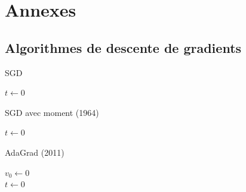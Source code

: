 \documentclass[11pt,a4paper, french]{article}
\newcommand{\vs}[1]{\vspace{#1cm}}
\theoremstyle{definition}
\begin{document}
\vs2

\nocite{kingma2017adammethodstochasticoptimization}
\nocite{starmer2023optimization}
\nocite{dereich2024convergenceratesadamoptimizer}
\renewcommand{\refname}{Sources}

\newpage

\section{Annexes}

\subsection{Algorithmes de descente de gradients}
\begin{algorithm*}
  \caption{SGD}
  $t\longleftarrow 0$ \\
\end{algorithm*}



\begin{algorithm*}
  \caption{SGD avec moment (1964)}
  $t\longleftarrow 0$ \\
  \label{SGD}
\end{algorithm*}



\begin{algorithm*}
  \caption{AdaGrad (2011)}
  $v_0\longleftarrow 0$ \\  
  $t\longleftarrow 0$ \\
  \label{adagrad}
\end{algorithm*}
\end{document}
